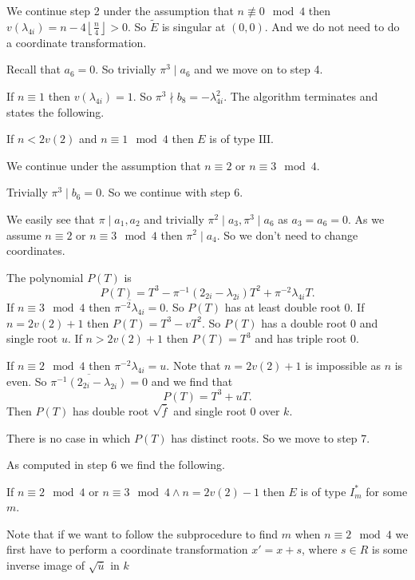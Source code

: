 We continue step 2 under the assumption that $n \not\equiv 0 \mod 4$ then $v(\lambda_{4i}) = n - 4 \left\lfloor \frac{n}{4} \right\rfloor >  0$. 
So $\tilde E$ is singular at $(0, 0)$. And we do not need to do a coordinate transformation. 



Recall that $a_6 = 0$. So trivially $\pi^3 \mid a_6$ and we move on to step 4.


If $n \equiv 1$ then $v(\lambda_{4i}) = 1$. So $\pi^3 \nmid b_8 = - \lambda_{4i}^2$. 
The algorithm terminates and states the following. 
\begin{tateconclusion}
	If $n < 2v(2)$ and $n \equiv 1 \mod 4$ then $E$ is of type  $\mathrm {III}$. 
\end{tateconclusion}
We continue under the assumption that $n \equiv 2$ or $n \equiv 3 \mod 4$. 

Trivially $\pi^3 \mid b_6 = 0$. 
So we continue with step 6.

We easily see that $\pi \mid a_1, a_2$ and trivially $\pi^2 \mid a_3, \pi^3 \mid a_6$ as $a_3 = a_6 = 0$. 
As we assume $n \equiv 2$ or $n \equiv 3 \mod 4$ then $\pi^2 \mid a_4$. 
So we don't need to change coordinates. 

The polynomial $P(T)$ is \[
	P(T) = T^3  -\pi^{-1}(2_{2i} - \lambda_{2i})T^2 + \pi^{-2}\lambda_{4i} T
.\] 
If $n \equiv 3 \mod 4$ then $\overline{\pi^{-2} \lambda_{4i}} = 0$. 
So $P(T)$ has at least double root $0$.
If $n = 2v(2) + 1$ then  $P(T) = T^3 - vT^2$. So $P(T)$ has a double root $0$ and single root $u$. 
If $n > 2v(2) + 1$ then $P(T) = T^3$ and has triple root $0$. 

If $n \equiv 2 \mod 4$ then $\pi^{-2} \lambda_{4i} = u$. 
Note that $n = 2v(2) +1 $ is impossible as $n$ is even. So $\overline{\pi^{-1} (2_{2i} - \lambda_{2i})} = 0$ and we find that \[
	P(T) = T^3 + u T
.\] 
Then $P(T)$ has double root $\sqrt{\overline{f}} $ and single root $0$ over $k$.

There is no case in which $P(T)$ has distinct roots. So we move to step 7.

As computed in step 6 we find the following. 
\begin{tateconclusion}
	If $n \equiv 2 \mod 4$ or $n \equiv 3 \mod 4 \wedge n = 2v(2) - 1$ then $E$ is of type $I_m^*$ for some $m$. 
\end{tateconclusion}

Note that if we want to follow the subprocedure to find $m$ when $n \equiv 2 \mod 4$ we first have to perform a coordinate transformation $x' = x + s$, where $s \in R$ is some inverse image of $\sqrt{\overline{u}} $ in $k$

